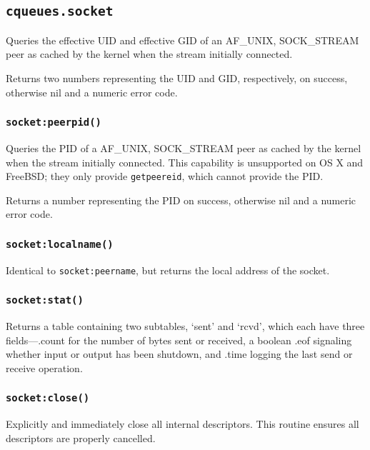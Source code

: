 \documentclass[11pt, oneside]{memoir}
\newcommand*{\fn}[1]{\texttt{#1}\xspace}
\newcounter{toccols}
\newenvironment{Module}[1]{
	\subsection{\texttt{#1}}
	\addtocontents{toc}{
		\protect\begin{multicols}{\value{toccols}}
	}
}{
	\addtocontents{toc}{\protect\end{multicols}}
}
\begin{document}
\begin{Module}{cqueues.socket}
Queries the effective UID and effective GID of an AF\_UNIX, SOCK\_STREAM peer as cached by the kernel when the stream initially connected.

Returns two numbers representing the UID and GID, respectively, on success, otherwise nil and a numeric error code.

\subsubsection[\fn{socket:peerpid}]{\fn{socket:peerpid()}}

Queries the PID of a AF\_UNIX, SOCK\_STREAM peer as cached by the kernel when the stream initially connected. This capability is unsupported on OS X and FreeBSD; they only provide \fn{getpeereid}, which cannot provide the PID.

Returns a number representing the PID on success, otherwise nil and a numeric error code.

\subsubsection[\fn{socket:localname}]{\fn{socket:localname()}}

Identical to \fn{socket:peername}, but returns the local address of the socket.

\subsubsection[\fn{socket:stat}]{\fn{socket:stat()}}

Returns a table containing two subtables, `sent' and `rcvd', which each have three fields---.count for the number of bytes sent or received, a boolean .eof  signaling whether input or output has been shutdown, and .time logging the last send or receive operation.

\subsubsection[\fn{socket:close}]{\fn{socket:close()}}
Explicitly and immediately close all internal descriptors. This routine ensures all descriptors are properly cancelled.

\end{Module}
\end{document}
